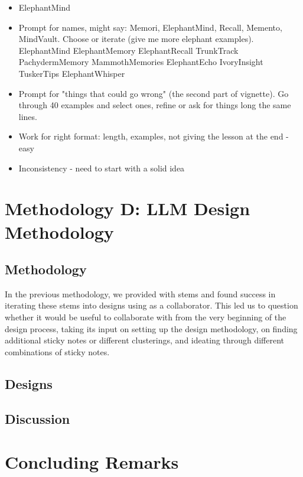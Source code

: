 \begin{itemize}
\item ElephantMind
\item Prompt for names, might say: Memori, ElephantMind, Recall, Memento,  MindVault. Choose or iterate (give me more elephant examples). ElephantMind
ElephantMemory
ElephantRecall
TrunkTrack
PachydermMemory
MammothMemories
ElephantEcho
IvoryInsight
TuskerTips
ElephantWhisper
\item Prompt for "things that could go wrong" (the second part of vignette). Go through 40 examples and select ones, refine or ask for things long the same lines. 
\item Work for right format: length, examples, not giving the lesson at the end - easy
\item Inconsistency - need to start with a solid idea
\end{itemize} 


\section{Methodology D: LLM Design Methodology}
\label{sec:meth4}

\subsection{Methodology}


In the previous methodology, we provided \gpt with stems and found success in iterating these stems into designs using \gpt as a collaborator.  This led us to question whether it would be useful to collaborate with \gpt from the very beginning of the design process, taking its input on setting up the design methodology, on finding additional sticky notes or different clusterings, and ideating through different combinations of sticky notes.

\subsection{Designs}


\subsection{Discussion}


\clearpage
\section{Concluding Remarks}




